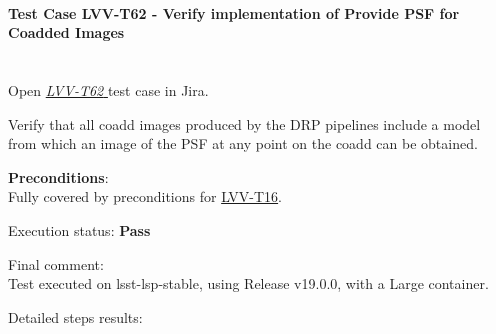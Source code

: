 \documentclass[DM,STR,toc]{lsstdoc}
\begin{document}
\paragraph{Test Case LVV-T62 -  Verify implementation of Provide PSF for Coadded Images
 }\mbox{}\\

Open  \href{https://jira.lsstcorp.org/secure/Tests.jspa#/testCase/LVV-T62}{\textit{ LVV-T62 } }
test case in Jira.

 Verify that all coadd images produced by the DRP pipelines include a
model from which an image of the PSF at any point on the coadd can be
obtained.


\textbf{ Preconditions}:\\
 Fully covered by preconditions for
\href{https://jira.lsstcorp.org/secure/Tests.jspa\#/testCase/LVV-T16}{LVV-T16}.


Execution status: {\bf Pass }

Final comment:\\ Test executed on lsst-lsp-stable, using Release v19.0.0, with a Large
container.



Detailed steps results:
\end{document}
